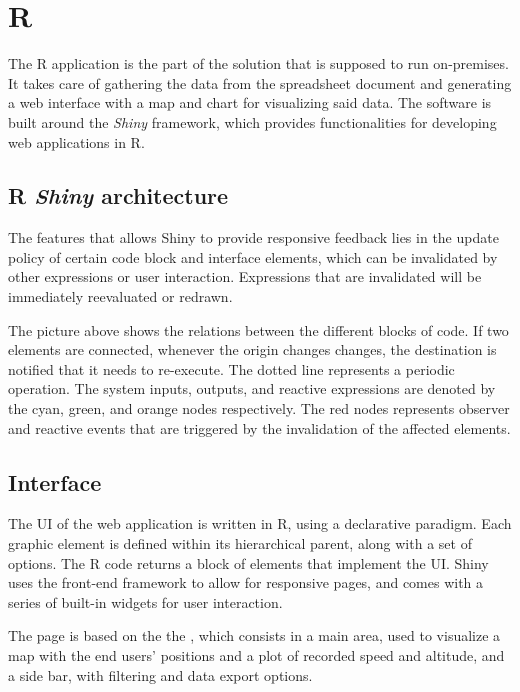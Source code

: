 \section{R}
The R application is the part of the solution that is supposed to run on-premises.
It takes care of gathering the data from the spreadsheet document and generating a web interface with a map and chart for visualizing said data.
The software is built around the \emph{Shiny} framework, which provides functionalities for developing web applications in R.


\subsection{R \emph{Shiny} architecture}
The features that allows Shiny to provide responsive feedback lies in the update policy of certain code block and interface elements, which can be invalidated by other expressions or user interaction.
Expressions that are invalidated will be immediately reevaluated or redrawn.


The picture above shows the relations between the different blocks of code.
If two elements are connected, whenever the origin changes changes, the destination is notified that it needs to re-execute.
The dotted line represents a periodic operation.
The system inputs, outputs, and reactive expressions are denoted by the cyan, green, and orange nodes respectively.
The red nodes represents observer and reactive events that are triggered by the invalidation of the affected elements.


\subsection{Interface}
The UI of the web application is written in R, using a declarative paradigm.
Each graphic element is defined within its hierarchical parent, along with a set of options.
The R code returns a block of  elements that implement the UI.
Shiny uses the  front-end framework to allow for responsive pages, and comes with a series of built-in widgets for user interaction.

The page is based on the the , which consists in a main area, used to visualize a map with the end users' positions and a plot of recorded speed and altitude, and a side bar, with filtering and data export options.

